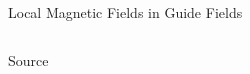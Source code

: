 \documentclass[final]{beamer}
\newlength{\sepwid}
\newlength{\onecolwid}
\newlength{\twocolwid}
\begin{document}
\begin{frame}[t]
\begin{columns}[t]
\begin{column}{\twocolwid}
\begin{block}{\huge{Local Magnetic Fields in Guide Fields}}
\begin{columns}[t,totalwidth=\twocolwid]
\begin{column}{\onecolwid}
\begin{block}{Source}
\end{block}
\end{column}
\end{columns}
\end{block}




\begin{columns}[t,totalwidth=\twocolwid]

\begin{column}{\onecolwid} %
\end{column}

\begin{column}{\sepwid}\end{column} %

\begin{column}{\onecolwid} %

\end{column}
\end{columns}

\end{column}
\begin{column}{\sepwid}\end{column} %


\end{columns} %

\end{frame} %
\end{document}
